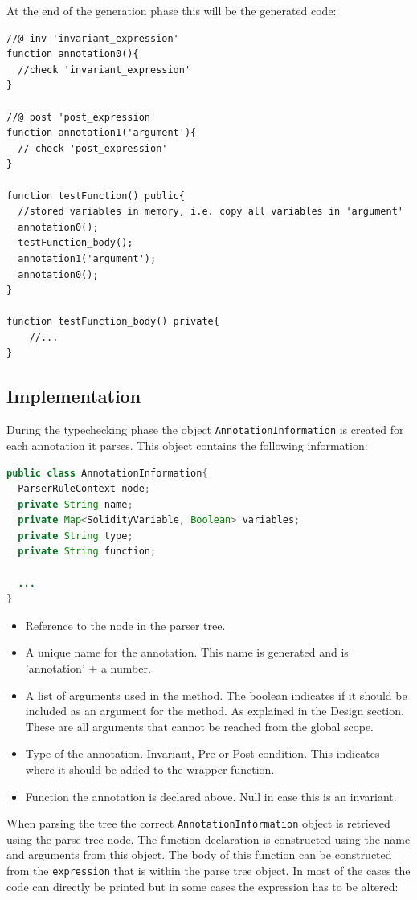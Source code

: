 \documentclass[a4paper]{article}
\begin{document}
At the end of the generation phase this will be the generated code:
\begin{lstlisting}[breaklines=true, language=Solidity ]
//@ inv 'invariant_expression'
function annotation0(){
  //check 'invariant_expression'
}

//@ post 'post_expression'
function annotation1('argument'){
  // check 'post_expression'
}

function testFunction() public{
  //stored variables in memory, i.e. copy all variables in 'argument'
  annotation0();
  testFunction_body();
  annotation1('argument');
  annotation0();
}

function testFunction_body() private{
    //...
}
\end{lstlisting}

\subsection{Implementation}
During the typechecking phase the object \texttt{AnnotationInformation} is created for each annotation it parses. This object contains the following information:
\begin{lstlisting}[breaklines=true, language=Java ]
public class AnnotationInformation{  
  ParserRuleContext node;
  private String name;
  private Map<SolidityVariable, Boolean> variables;
  private String type;
  private String function;

  ...
}
\end{lstlisting}
\begin{itemize}
  \item Reference to the node in the parser tree.
  \item A unique name for the annotation. This name is generated and is 'annotation' + a number.
  \item A list of arguments used in the method. The boolean indicates if it should be included as an argument for the method. As explained in the Design section. These are all arguments that cannot be reached from the global scope.
  \item Type of the annotation. Invariant, Pre or Post-condition. This indicates where it should be added to the wrapper function.
  \item Function the annotation is declared above. Null in case this is an invariant.
\end{itemize}
When parsing the tree the correct \texttt{AnnotationInformation} object is retrieved using the parse tree node. The function declaration is constructed using the name and arguments from this object. The body of this function can be constructed from the \texttt{expression} that is within the parse tree object. In most of the cases the code can directly be printed but in some cases the expression has to be altered:
\end{document}
